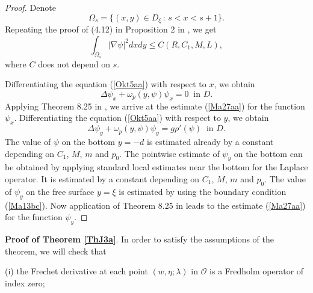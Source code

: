 \documentclass[a4paper,reqno,12pt]{amsart}
\theoremstyle{plain}
\theoremstyle{definition}
\numberwithin{equation}{section}
\begin{document}
\begin{proof}
Denote
$$
\Omega_s=\{(x,y)\in D_{\xi}\,:\,s<x<s+1\}.
$$
Repeating the proof of (4.12) in Proposition 2 in \cite{KLN17}, we get
$$
\int_{\Omega_s} |\nabla\psi|^2 dxdy\leq C(R,C_1,M,L),
$$
where $C$ does not depend on $s$. 

Differentiating the equation (\ref{Okt5aa}) with respect to $x$, we obtain
\begin{equation*}
\Delta\psi_x+\omega_p(y,\psi)\psi_x=0\;\;\mbox{in $D$}.
\end{equation*}
Applying Theorem 8.25 in \cite{GT}, we arrive at the estimate (\ref{Ma27aa}) for the function $\psi_x$.
Differentiating the equation (\ref{Okt5aa}) with respect to $y$, we obtain
\begin{equation*}
\Delta\psi_y+\omega_p(y,\psi)\psi_y=g\rho'(\psi)\;\;\mbox{in $D$}.
\end{equation*}
The value of $\psi$ on the bottom $y=-d$ is estimated already by a constant depending on $C_1$, $M$, $m$ and $p_0$.
The pointwise estimate of $\psi_y$ on the bottom can be obtained by applying standard local estimates near the bottom for the Laplace operator. It is estimated by a constant depending on $C_1$, $M$, $m$ and $p_0$.
The value of $\psi_y$ on the free surface $y=\xi$ is estimated by using the boundary condition (\ref{Ma13bc}). Now application of Theorem 8.25 in \cite{GT}
leads to the estimate (\ref{Ma27aa}) for the function $\psi_y$.


\end{proof}





\bigskip
{\bf Proof of Theorem \ref{ThJ3a}}. In order to satisfy the assumptions of the theorem, we will check that

(i) the Frechet derivative at each point $(w,\eta;\lambda)$ in ${\mathcal O}$ is a Fredholm operator of index zero;
\end{document}
